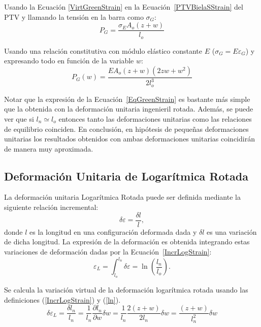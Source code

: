 Usando la Ecuación \eqref{VirtGreenStrain} en la Ecuación~\eqref{PTVBielaSStrain} del PTV y llamando la tensión en la barra como $\sigma_G$:
%
\begin{equation}
P_G = \frac{\sigma_EA_o(z+w)}{l_o}
\end{equation}

Usando una relación constitutiva con módulo elástico constante $E$ ($\sigma_G = E \varepsilon_G$) y expresando todo en función de la variable $w$:
%
\begin{equation}\label{EqGreenStrain}
	\boxed{
P_G(w) = \frac{EA_o(z+w)\left(2zw+w^2\right)}{2l_o^3}
}
\end{equation}

Notar que la expresión de la Ecuación~\eqref{EqGreenStrain} es bastante más simple que la obtenida con la deformación unitaria ingenieril rotada. Además, se puede ver que si $l_n\simeq l_o$ entonces tanto las deformaciones unitarias como las relaciones de equilibrio coinciden. En conclusión, en hipótesis de pequeñas deformaciones unitarias los resultados obtenidos con ambas deformaciones unitarias coincidirán de manera muy aproximada.

\subsection{Deformación Unitaria de Logarítmica Rotada}

La deformación unitaria Logarítmica Rotada puede ser definida mediante la siguiente relación incremental:
%
\begin{equation}\label{IncrLogStrain}
\delta \varepsilon = \frac{\delta l}{l},
\end{equation}
%
donde $l$ es la longitud en una configuración deformada dada y $\delta l$ es una variación de dicha longitud. %
La expresión de la deformación es obtenida integrando estas variaciones de deformación dadas por la Ecuación~\eqref{IncrLogStrain}:
%
\begin{equation}\label{LogStrain}
\varepsilon_L = \int_{l_o}^{l_n}\delta \varepsilon = \ln\left(\frac{l_n}{l_o}\right).
\end{equation}


Se calcula la variación virtual de la deformación logarítmica rotada usando las definiciones (\ref{IncrLogStrain}) y (\ref{ln}).
%
\begin{equation}\label{VirtLogStrain}
\delta \varepsilon_L = \frac{\delta l_n}{l_n} = \frac{1}{l_n}\frac{\partial l_n}{\partial w}\delta w = \frac{1}{l_n} \frac{2(z+w)}{2l_n}\delta w = \frac{(z+w)}{l_n^2}\delta w
\end{equation}

